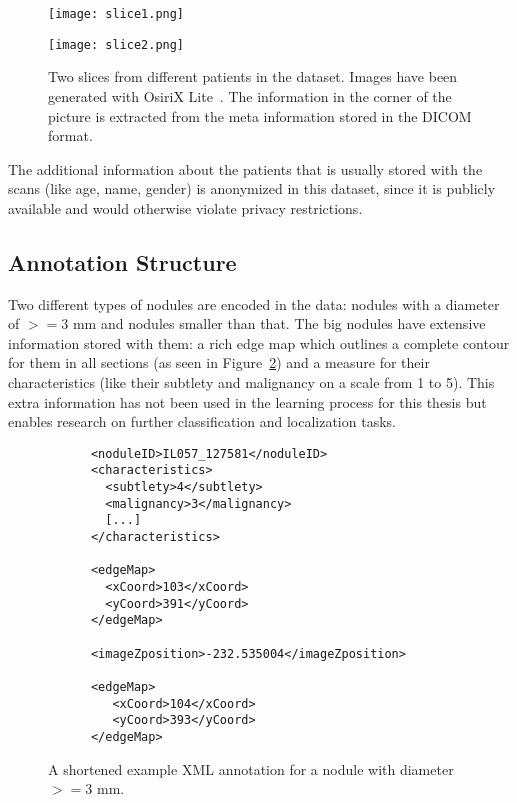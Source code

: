 \documentclass[../Thesis.tex]{subfiles}
\begin{document}
\begin{figure}[!tbp]
\centering
\begin{minipage}[b]{0.7\textwidth}
	\texttt{[image: slice1.png]}
\end{minipage}
\begin{minipage}[b]{0.7\textwidth}
	\texttt{[image: slice2.png]}
\end{minipage}
\caption{Two slices from different patients in the dataset. Images have been generated with OsiriX Lite~\cite{rosset2004osirix}. The information in the corner of the picture is extracted from the meta information stored in the DICOM format.}
\label{fig:slices}
\end{figure}

The additional information about the patients that is usually stored with the scans (like age, name, gender) is anonymized in this dataset, since it is publicly available and would otherwise violate privacy restrictions.

\subsection{Annotation Structure}
Two different types of nodules are encoded in the data: nodules with a diameter of $>=3$ mm and nodules smaller than that. The big nodules have extensive information stored with them: a rich edge map which outlines a complete contour for them in all sections (as seen in Figure~\ref{fig:bigNod}) and a measure for their characteristics (like their subtlety and malignancy on a scale from 1 to 5). This extra information has not been used in the learning process for this thesis but enables research on further classification and localization tasks.

\begin{figure}
\begin{lstlisting}
      <noduleID>IL057_127581</noduleID>
      <characteristics>
        <subtlety>4</subtlety>
        <malignancy>3</malignancy>
        [...]
      </characteristics>
      
      <edgeMap>
        <xCoord>103</xCoord>
        <yCoord>391</yCoord>
      </edgeMap>
 
      <imageZposition>-232.535004</imageZposition>
       
      <edgeMap>
         <xCoord>104</xCoord>
         <yCoord>393</yCoord>
      </edgeMap>
\end{lstlisting}
\caption{A shortened example XML annotation for a nodule with diameter $>=3$ mm.}
\label{fig:bigNod}
\end{figure}
\end{document}
